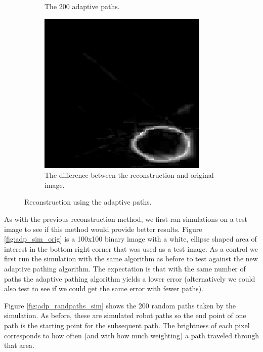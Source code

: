 \documentclass[english]{article}\usepackage[]{graphicx}\usepackage[]{color}
\begin{document}
\begin{figure}[H]
\begin{subfigure}{.22\textwidth}
  \caption{The 200 adaptive paths.}
  \vspace{10pt}
  \label{fig:adp_adpaths}
\end{subfigure}%
\hspace {10pt}
\begin{subfigure}{.22\textwidth}
  \centering
    \includegraphics[width=1\linewidth]{figures/adaptiveresulterror}
  \caption{The difference between the reconstruction and original image.}
  \vspace{0pt}
  \label{fig:adp_adpaths_sim_diff}
\end{subfigure}
\caption{Reconstruction using the adaptive paths.}
\label{fig:adp_adpaths_sim_fig}

\end{figure}
As with the previous reconstruction method, we first ran simulations on a test image to see if this method would provide better results. Figure \ref{fig:adp_sim_orig} is a 100x100 binary image with a white, ellipse shaped area of interest in the bottom right corner that was used as a test image. As a control we first run the simulation with the same algorithm as before to test against the new adaptive pathing algorithm. The expectation is that with the same number of paths the adaptive pathing algorithm yields a lower error (alternatively we could also test to see if we could get the same error with fewer paths).  

Figure \ref{fig:adp_randpaths_sim} shows the 200 random paths taken by the simulation. As before, these are simulated robot paths so the end point of one path is the starting point for the subsequent path. The brightness of each pixel corresponds to how often (and with how much weighting) a path traveled through that area. 
\end{document}
